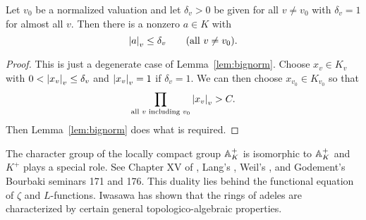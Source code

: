 \begin{corollary}\label{cor:small_a}
Let $v_0$ be a normalized valuation and let $\delta_v>0$ be given
for all $v\neq v_0$ with $\delta_v = 1$ for almost all $v$.  Then
there is a nonzero $a\in K$ with
$$
  \abs{a}_v \leq \delta_v\qquad\text{(all $v\neq v_0$)}.
$$
\end{corollary}
\begin{proof}
This is just a degenerate case of Lemma~\ref{lem:bignorm}.
Choose $x_v\in K_v$ with $0< \abs{x_v}_v \leq \delta_v$
and $\abs{x_v}_v=1$ if $\delta_v=1$.  We can then choose
$x_{v_0}\in K_{v_0}$ so that
$$
\prod_{\text{all $v$ including $v_0$}} \abs{x_v}_v > C.
$$
Then Lemma~\ref{lem:bignorm} does what is required.
\end{proof}

\begin{remark}
  The character group of the locally compact group $\AA_K^+$ is
  isomorphic to $\AA_K^+$ and $K^+$ plays a special role.  See Chapter
  XV of \cite{cassels-frohlich}, Lang's \cite{lang:algebraic_numbers},
  Weil's \cite{weil:adeles}, and Godement's Bourbaki seminars 171 and
  176.  This duality lies behind the functional equation of $\zeta$
  and $L$-functions.  Iwasawa has shown \cite{iwasawa:adele} that the
  rings of adeles are characterized by certain general
  topologico-algebraic properties.
\end{remark}


